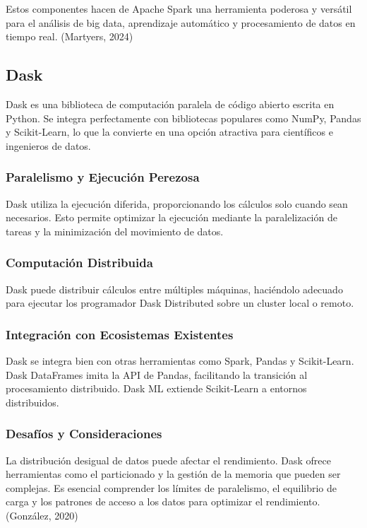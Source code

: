 	Estos componentes hacen de Apache Spark una herramienta poderosa y versátil para el análisis de big data, aprendizaje automático y procesamiento de datos en tiempo real. (Martyers, 2024)
	
	\subsection{Dask}
	
	Dask es una biblioteca de computación paralela de código abierto escrita en Python. Se integra perfectamente con bibliotecas populares como NumPy, Pandas y Scikit-Learn, lo que la convierte en una opción atractiva para científicos e ingenieros de datos.
	
	\subsubsection{Paralelismo y Ejecución Perezosa}
	Dask utiliza la ejecución diferida, proporcionando los cálculos solo cuando sean necesarios. Esto permite optimizar la ejecución mediante la paralelización de tareas y la minimización del movimiento de datos.
	
	\subsubsection{Computación Distribuida}
	Dask puede distribuir cálculos entre múltiples máquinas, haciéndolo adecuado para ejecutar los programador Dask Distributed sobre un cluster local o remoto.
	
	\subsubsection{Integración con Ecosistemas Existentes}
	Dask se integra bien con otras herramientas como Spark, Pandas y Scikit-Learn. Dask DataFrames imita la API de Pandas, facilitando la transición al procesamiento distribuido. Dask ML extiende Scikit-Learn a entornos distribuidos.
	
	\subsubsection{Desafíos y Consideraciones}
	La distribución desigual de datos puede afectar el rendimiento. Dask ofrece herramientas como el particionado y la gestión de la memoria que pueden ser complejas. Es esencial comprender los límites de paralelismo, el equilibrio de carga y los patrones de acceso a los datos para optimizar el rendimiento.(González, 2020) 
	
